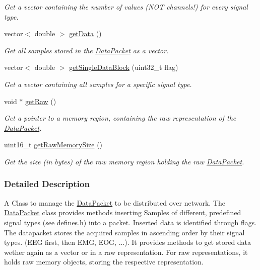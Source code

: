 \begin{DoxyCompactItemize}
\begin{DoxyCompactList}\small\item\em Get a vector containing the number of values (NOT channels!) for every signal type. \item\end{DoxyCompactList}\item 
vector$<$ double $>$ \hyperlink{class_data_packet_ae12c2a5fae637439431ddd66376ff797}{getData} ()
\begin{DoxyCompactList}\small\item\em Get all samples stored in the \hyperlink{class_data_packet}{DataPacket} as a vector. \item\end{DoxyCompactList}\item 
vector$<$ double $>$ \hyperlink{class_data_packet_a4342e5412615ed2d09990b557bdb700a}{getSingleDataBlock} (uint32\_\-t flag)
\begin{DoxyCompactList}\small\item\em Get a vector containing all samples for a specific signal type. \item\end{DoxyCompactList}\item 
void $\ast$ \hyperlink{class_data_packet_a6d05054482f9844487d5253a1b903a1e}{getRaw} ()
\begin{DoxyCompactList}\small\item\em Get a pointer to a memory region, containing the raw representation of the \hyperlink{class_data_packet}{DataPacket}. \item\end{DoxyCompactList}\item 
uint16\_\-t \hyperlink{class_data_packet_a20f62ad94659c0f7f2faf143084764e5}{getRawMemorySize} ()
\begin{DoxyCompactList}\small\item\em Get the size (in bytes) of the raw memory region holding the raw \hyperlink{class_data_packet}{DataPacket}. \item\end{DoxyCompactList}\end{DoxyCompactItemize}


\subsubsection{Detailed Description}
A Class to manage the \hyperlink{class_data_packet}{DataPacket} to be distributed over network. The \hyperlink{class_data_packet}{DataPacket} class provides methods inserting Samples of different, predefined signal types (see \hyperlink{defines_8h}{defines.h}) into a packet. Inserted data is identified through flags. The datapacket stores the acquired samples in ascending order by their signal types. (EEG first, then EMG, EOG, ...). It provides methods to get stored data wether again as a vector or in a raw representation. For raw representations, it holds raw memory objects, storing the respective representation.

